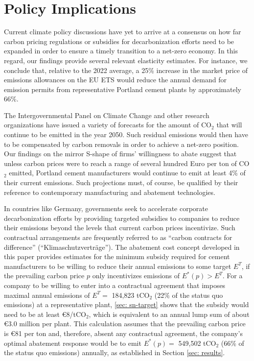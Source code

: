 \documentclass[12pt, a4paper]{article} %
\begin{document}
\section{Policy Implications}
\label{sec: policy}

Current climate policy discussions have yet to arrive at a consensus on how far carbon pricing regulations or subsidies for decarbonization efforts need to be expanded in order to ensure a timely transition to a net-zero economy. In this regard, our findings provide several relevant elasticity estimates. For instance, we conclude that, relative to the 2022 average,  a 25\% increase in the market price of emissions allowances on the EU ETS would reduce the annual demand for emission permits from representative Portland cement plants by approximately 66\%.

The Intergovernmental Panel on Climate Change and other research organizations have issued a variety of forecasts for the amount of CO$_2$ that will continue to be emitted in the year 2050. Such residual emissions would then have to be compensated by carbon removals in order to achieve a net-zero position. Our findings on the mirror S-shape of firms' willingness to abate suggest that unless carbon prices were to reach a range of several hundred Euro per ton of CO$_2$ emitted, Portland cement manufacturers would continue to emit at least 4\% of their current emissions. Such projections must, of course, be qualified by their reference to contemporary manufacturing and abatement technologies.

In countries like Germany, governments seek to accelerate corporate decarbonization efforts by providing targeted subsidies to companies to reduce their emissions beyond the levels that current carbon prices incentivize. Such contractual arrangements are frequently referred to as ``carbon contracts for difference'' (``Klimaschutzvertr\"age''). The abatement cost concept developed in this paper provides estimates for the minimum subsidy required for cement manufacturers to be willing to reduce their annual emissions to some target $E^T$, if the prevailing carbon price $p$ only incentivizes emissions of $E^*(p) > E^T$. For a company to be willing to enter into a contractual agreement that imposes maximal annual emissions of $E^T =$ 184,823 tCO$_2$ (22\% of the status quo emissions) at a representative plant, \ref{sec: sn-target} shows that the subsidy would need to be at least \euro 8/tCO$_2$, which is equivalent to an annual lump sum of about \euro 3.0 million per plant. This calculation assumes that the prevailing carbon price is \euro 81 per ton and, therefore, absent any contractual agreement, the company's optimal abatement response would be to emit $E^*(p)=$ 549,502 tCO$_2$ (66\% of the status quo emissions) annually, as established in Section \ref{sec: results}.
\end{document}
